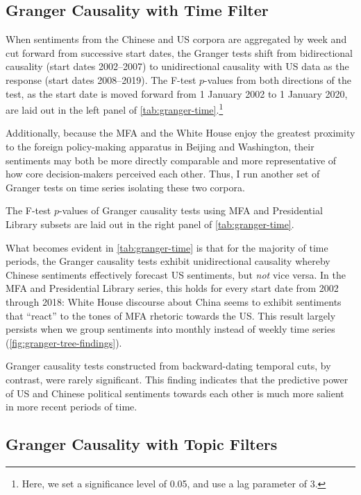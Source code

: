\documentclass[12pt,letterpaper]{article}
\begin{document}
\subsection{Granger Causality with Time Filter}

When sentiments from the Chinese and US corpora are aggregated by week and cut forward from successive start dates, the Granger tests shift from bidirectional causality (start dates 2002--2007) to unidirectional causality with US data as the response (start dates 2008--2019). The F-test $p$-values from both directions of the test, as the start date is moved forward from 1 January 2002 to 1 January 2020, are laid out in the left panel of \cref{tab:granger-time}.\footnote{Here, we set a significance level of 0.05, and use a lag parameter of 3.}



Additionally, because the MFA and the White House enjoy the greatest proximity to the foreign policy-making apparatus in Beijing and Washington, their sentiments may both be more directly comparable and more representative of how core decision-makers perceived each other. Thus, I run another set of Granger tests on time series isolating these two corpora.

The F-test $p$-values of Granger causality tests using MFA and Presidential Library subsets are laid out in the right panel of \cref{tab:granger-time}.

What becomes evident in \cref{tab:granger-time} is that for the majority of time periods, the Granger causality tests exhibit unidirectional causality whereby Chinese sentiments effectively forecast US sentiments, but \emph{not} vice versa. In the MFA and Presidential Library series, this holds for every start date from 2002 through 2018: White House discourse about China seems to exhibit sentiments that ``react'' to the tones of MFA rhetoric towards the US. This result largely persists when we group sentiments into monthly instead of weekly time series (\cref{fig:granger-tree-findings}).

Granger causality tests constructed from backward-dating temporal cuts, by contrast, were rarely significant. This finding indicates that the predictive power of US and Chinese political sentiments towards each other is much more salient in more recent periods of time.

\subsection{Granger Causality with Topic Filters}
\end{document}
